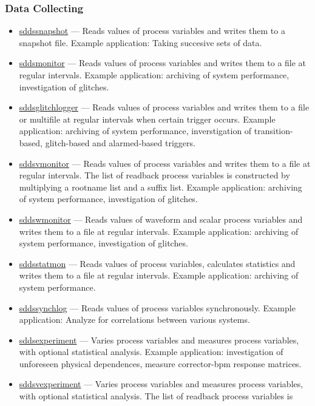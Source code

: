 \documentclass[11pt]{article}
\newcommand{\progref}[1]{\hyperref{#1}{{\tt #1} (}{)}{#1}}
\begin{document}
\subsubsection{Data Collecting}
\begin{itemize}
\item \progref{sddssnapshot} --- Reads values of process variables and writes them to a snapshot file. 
        Example application: Taking succesive sets of data.
\item \progref{sddsmonitor} --- Reads values of process variables and writes them to a file at regular intervals.
        Example application: archiving of system performance, investigation of glitches.
\item \progref{sddsglitchlogger} --- Reads values of process variables and writes them to a file or multifile at regular intervals when certain trigger occurs. 
        Example application: archiving of system performance, inverstigation of 
        transition-based, glitch-based and alarmed-based triggers. 
\item \progref{sddsvmonitor} --- Reads values of process variables
        and writes them to a file at regular intervals. The list of readback process
        variables is constructed by multiplying a rootname list and a suffix list.
        Example application: archiving of system performance, investigation of
        glitches.
\item \progref{sddswmonitor} --- Reads values of waveform and scalar process variables and writes them to a file at regular intervals.
        Example application: archiving of system performance, investigation of glitches.
\item \progref{sddsstatmon} --- Reads values of process variables, calculates statistics and writes them to a file at regular intervals.
        Example application: archiving of system performance.
\item \progref{sddssynchlog} --- Reads values of process variables
        synchronously.  Example application: Analyze for correlations
        between various systems.
\item \progref{sddsexperiment} --- Varies process variables and measures process variables, 
        with optional statistical analysis.
        Example application:  investigation of unforeseen physical dependences,
        measure corrector-bpm response matrices.
\item \progref{sddsvexperiment} --- Varies process variables and measures process variables, 
        with optional statistical analysis. The list of readback process variables is

\end{itemize}
\end{document}

